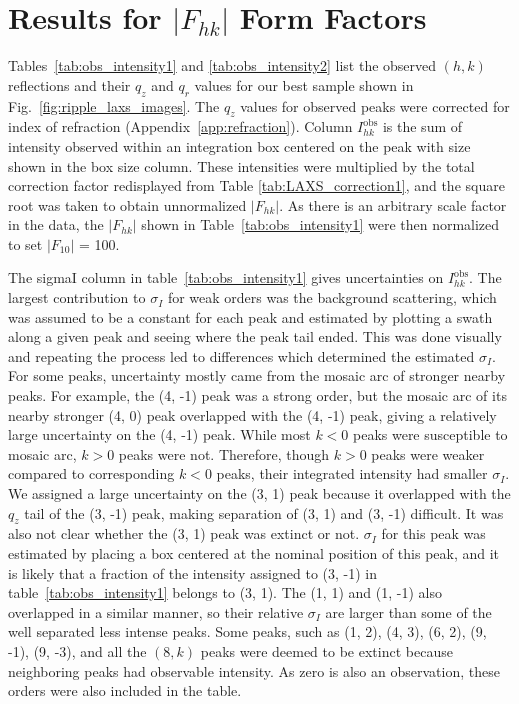 \newpage
\section{Results for $|F_{hk}|$ Form Factors}\label{sec:LAXS_form_factors}
Tables~\ref{tab:obs_intensity1} and 
\ref{tab:obs_intensity2} list the observed 
$(h,k)$ reflections and their $q_z$ and $q_r$ values for our best sample shown 
in Fig.~\ref{fig:ripple_laxs_images}. The $q_z$ values 
for observed peaks were corrected for index of refraction (Appendix~\ref{app:refraction}).
Column $I^\text{obs}_{hk}$ is the sum of intensity observed within an
integration box centered on the peak with size shown in the box size column.  
These intensities were multiplied by the total correction factor redisplayed 
from Table \ref{tab:LAXS_correction1},
and the square root was taken to obtain 
unnormalized  $|F_{hk}|$.  
As there is an arbitrary scale factor in the data, the $|F_{hk}|$ shown in 
Table~\ref{tab:obs_intensity1} were then normalized to set $|F_{10}|$ = 100.

The \gls{sigmaI} column in table~\ref{tab:obs_intensity1} gives uncertainties on 
$I^\text{obs}_{hk}$.
The largest contribution to $\sigma_I$ for weak orders was the background 
scattering, which
was assumed to be a constant for each peak and 
estimated by plotting a swath along a given peak 
and seeing where the peak tail ended. This was done visually and repeating 
the process led to differences which determined the estimated $\sigma_I$.  
For some peaks, uncertainty mostly came 
from the mosaic arc of stronger nearby peaks. For example, the (4, -1) peak was a
strong order, but the mosaic arc of its nearby stronger (4, 0) peak  
overlapped with the (4, -1) peak, giving a relatively large uncertainty
on the (4, -1) peak. While most $k<0$ peaks were susceptible to
mosaic arc, $k > 0$ peaks were not. Therefore, though $k> 0$ peaks were weaker
compared to corresponding $k < 0$ peaks, their integrated intensity
had smaller $\sigma_I$. We assigned a large uncertainty on the (3, 1) peak because
it overlapped with the $q_z$ tail of the (3, -1) peak, making separation of 
(3, 1) and (3, -1) difficult. It was also not clear whether the (3, 1) peak
was extinct or not. $\sigma_I$ for this peak was estimated by placing a
box centered at the nominal position of this peak, and it is likely that a fraction
of the intensity assigned to (3, -1) in table~\ref{tab:obs_intensity1} belongs to (3, 1).
The (1, 1) and (1, -1) also overlapped in a similar manner, so their
relative $\sigma_I$ are larger than some of the well separated less intense peaks.  
Some peaks, such as (1, 2), (4, 3), (6, 2), (9, -1), (9, -3), and all the 
$(8,k)$ peaks were deemed to be extinct because neighboring peaks had 
observable intensity. As zero is also an observation, these orders were also 
included in the table. 

